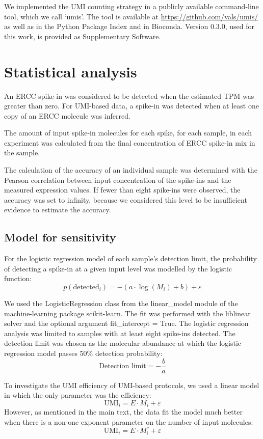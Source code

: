 We implemented the UMI counting strategy in a publicly available command-line tool, which we call ‘umis’. The tool is available at \url{https://github.com/vals/umis/} as well as in the Python Package Index and in Bioconda. Version 0.3.0, used for this work, is provided as Supplementary Software.

\section{Statistical analysis}

An ERCC spike-in was considered to be detected when the estimated TPM was greater than zero. For UMI-based data, a spike-in was detected when at least one copy of an ERCC molecule was inferred.

The amount of input spike-in molecules for each spike, for each sample, in each experiment was calculated from the final concentration of ERCC spike-in mix in the sample.

The calculation of the accuracy of an individual sample was determined with the Pearson correlation between input concentration of the spike-ins and the measured expression values. If fewer than eight spike-ins were observed, the accuracy was set to infinity, because we considered this level to be insufficient evidence to estimate the accuracy.

\subsection{Model for sensitivity}

For the logistic regression model of each sample’s detection limit, the probability of detecting a spike-in at a given input level was modelled by the logistic function:
\[
    p(\text{detected}_i)= -(a \cdot \log(M_i) + b) + \varepsilon
\]

We used the LogisticRegression class from the linear\_model module of the machine-learning package scikit-learn. The fit was performed with the liblinear solver and the optional argument fit\_intercept = True. The logistic regression analysis was limited to samples with at least eight spike-ins detected. The detection limit was chosen as the molecular abundance at which the logistic regression model passes 50\% detection probability:
\[
    \text{Detection limit} = -\frac{b}{a}
\]

To investigate the UMI efficiency of UMI-based protocols, we used a linear model in which the only parameter was the efficiency:
\[
    \text{UMI}_i = E \cdot M_i + \varepsilon
\]
However, as mentioned in the main text, the data fit the model much better when there is a non-one exponent parameter on the number of input molecules:
\[
    \text{UMI}_i = E \cdot M_i^c + \varepsilon
\]

